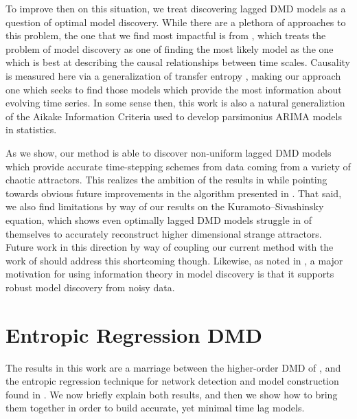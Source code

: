 \documentclass[a4paper,11pt]{article}
\begin{document}
To improve then on this situation, we treat discovering lagged DMD models as a question of optimal model discovery.  While there are a plethora of approaches to this problem, the one that we find most impactful is from \cite{bollt2}, which treats the problem of model discovery as one of finding the most likely model as the one which is best at describing the causal relationships between time scales.  Causality is measured here via a generalization of transfer entropy \cite{schreiber, bollt}, making our approach one which seeks to find those models which provide the most information about evolving time series.  In some sense then, this work is also a natural generaliztion of the Aikake Information Criteria \cite{aikake} used to develop parsimonius ARIMA models in statistics.  

As we show, our method is able to discover non-uniform lagged DMD models which provide accurate time-stepping schemes from data coming from a variety of chaotic attractors.  This realizes the ambition of the results in \cite{arbabi} while pointing towards obvious future improvements in the algorithm presented in \cite{curtis_dldmd}.  That said, we also find limitations by way of our results on the Kuramoto--Sivashinsky equation, which shows even optimally lagged DMD models struggle in of themselves to accurately reconstruct higher dimensional strange attractors.  Future work in this direction by way of coupling our current method with the work of \cite{curtis_dldmd} should address this shortcoming though.  Likewise, as noted in \cite{bollt2}, a major motivation for using information theory in model discovery is that it supports robust model discovery from noisy data.  

\section{Entropic Regression DMD}

The results in this work are a marriage between the higher-order DMD of \cite{clainche}, and the entropic regression technique for network detection and model construction found in \cite{bollt, bollt2}.  We now briefly explain both results, and then we show how to bring them together in order to build accurate, yet minimal time lag models.     
\end{document}
